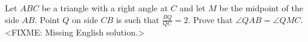 \problem
Let $ABC$ be a triangle with a right angle at $C$ and let $M$ be the midpoint
of the side $AB$.
Point $Q$ on side $CB$ is such that $\frac{BQ}{QC} = 2$.
Prove that $\angle QAB = \angle QMC$.
\solution
<FIXME: Missing English solution.>
\endproblem
